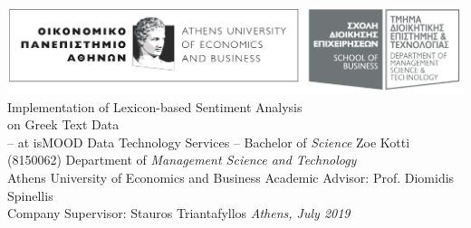 \documentclass[dvips, letterpaper, 12pt]{report}
\begin{document}
\sloppy


\thesistitle
    {\includegraphics[width=\textwidth]{aueb_logo.eps}}
	{Implementation of Lexicon-based Sentiment Analysis \\
	\vspace{3mm}
	 on Greek Text Data \\
	\vspace{1cm}
	 -- at isMOOD Data Technology Services --}
    {Bachelor of \emph{Science}}
	{Zoe Kotti}
	{(8150062)}
	{Department of \emph{Management Science and Technology} \\
     Athens University of Economics and Business}
	{Academic Advisor: Prof. Diomidis Spinellis \\
     Company Supervisor: Stauros Triantafyllos}
    {\emph{Athens, July 2019}}




\tableofcontents














\appendix

\end{document}
